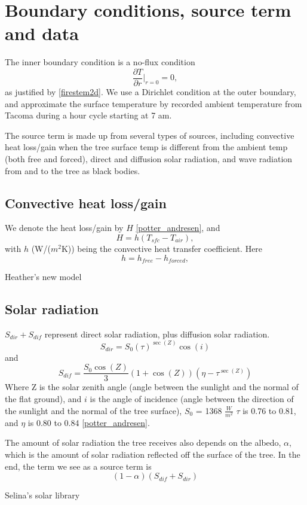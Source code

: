 \documentclass{IEEEtran} %
\begin{document}
\section{Boundary conditions, source term and data} 
The inner boundary condition is a no-flux condition
\begin{equation}
    \frac{\partial T}{\partial r}\bigg|_{r=0}=0,
\end{equation} as justified by \ref{firestem2d}.
We use a Dirichlet condition at the outer boundary, and approximate the surface temperature by recorded ambient temperature from Tacoma during a { hour cycle starting at 7 am. }

The source term is made up from several types of sources, {\bluep including convective heat loss/gain when the tree surface temp is different from the ambient temp (both free and forced), direct and diffusion solar radiation, and wave radiation from and to the tree as black bodies. } 

\subsection{Convective heat loss/gain}
{\bluep We denote the heat loss/gain by $H$ \ref{potter_andresen}, and 
\begin{equation}
H=h(T_{sfc}-T_{air}),
\end{equation}
with $h$ (W/($m^2$K)) being the convective heat transfer coefficient. Here
\begin{equation}
h=h_{free}-h_{forced},
\end{equation}

Heather's new model}

\subsection{Solar radiation}
{\bluep $S_{dir} + S_{dif}$ represent direct solar radiation, plus diffusion solar radiation.
\begin{equation}
S_{dir} = S_0(\tau)^{\sec(Z)}\cos(i)
\end{equation}
and
\begin{equation}
S_{dif} = \frac{S_0\cos(Z)}{3}(1+\cos(Z))(\eta-\tau^{\sec(Z)})
\end{equation}
Where Z is the solar zenith angle (angle between the sunlight and the normal of the flat ground), and $i$ is the angle of incidence (angle between the direction of the sunlight and the normal of the tree surface), $S_0$ = 1368 $\frac{W}{m^2}$ $\tau$ is 0.76 to 0.81, and $\eta$ is 0.80 to 0.84 \ref{potter_andresen}. 

The amount of solar radiation the tree receives also depends on the albedo, $\alpha$, which is the amount of solar radiation reflected off the surface of the tree. 
In the end, the term we see as a source term is
\begin{equation}
(1-\alpha)(S_{dif}+S_{dir})
\end{equation}

Selina's solar library}
\end{document}
